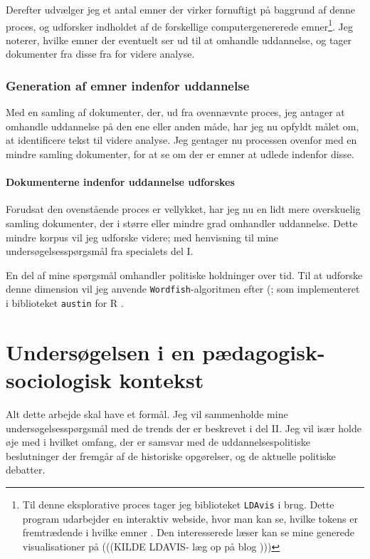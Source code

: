 Derefter udvælger jeg et antal emner der virker fornuftigt på baggrund af denne proces, og udforsker indholdet af de forskellige computergenererede emner\footnote{Til denne eksplorative proces tager jeg biblioteket \texttt{LDAvis} i brug. Dette program udarbejder en interaktiv webside, hvor man kan se, hvilke tokens er fremtrædende i hvilke emner \autocite{sievertCpsievertLDAvis2020}. Den interesserede læser kan se mine generede visualisationer på (((KILDE LDAVIS- læg op på blog )))}.
Jeg noterer, hvilke emner der eventuelt ser ud til at omhandle uddannelse, og tager dokumenter fra disse fra for videre analyse.

\subsection{Generation af emner indenfor uddannelse}
Med en samling af dokumenter, der, ud fra ovennævnte proces, jeg antager at omhandle uddannelse på den ene eller anden måde, har jeg nu opfyldt målet om, at identificere tekst til videre analyse.
Jeg gentager nu processen ovenfor med en mindre samling dokumenter, for at se om der er emner at udlede indenfor disse.

\subsubsection{Dokumenterne indenfor uddannelse udforskes}
Forudsat den ovenstående proces er vellykket, har jeg nu en lidt mere overskuelig samling dokumenter, der i større eller mindre grad omhandler uddannelse.
Dette mindre korpus vil jeg udforske videre; med henvisning til mine undersøgelsesspørgsmål fra specialets del I.

En del af mine spørgsmål omhandler politiske holdninger over tid. Til at udforske denne dimension vil jeg anvende \texttt{Wordfish}-algoritmen efter \citeauthor{slapinScalingModelEstimating2008} (\citeyear{slapinScalingModelEstimating2008}; som implementeret i biblioteket \texttt{austin} for R \autocite{loweAustinPackageDoing2019}.

\chapter{Undersøgelsen i en pædagogisk-sociologisk kontekst}\label{chap:edusoc}

Alt dette arbejde skal have et formål.
Jeg vil sammenholde mine undersøgelsesspørgsmål med de trends der er beskrevet i del II.
Jeg vil især holde øje med i hvilket omfang, der er samsvar med de uddannelsespolitiske beslutninger der fremgår af de historiske opgørelser, og de aktuelle politiske debatter.


